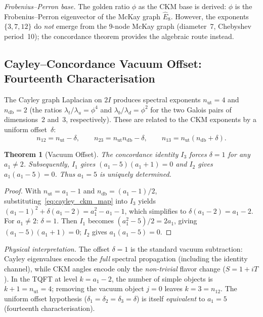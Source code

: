 \documentclass[12pt,a4paper]{article}
\newtheorem{theorem}{Theorem}
\theoremstyle{definition}
\begin{document}
\textit{Frobenius--Perron base.}  The golden ratio $\phi$ as the CKM base is derived: $\phi$ is the Frobenius--Perron eigenvector of the McKay graph $\hat{E}_8$.  However, the exponents $\{3,7,12\}$ do \emph{not} emerge from the 9-node McKay graph (diameter~7, Chebyshev period~10); the concordance theorem provides the algebraic route instead.

\subsection{Cayley--Concordance Vacuum Offset: Fourteenth Characterisation}
\label{sec:vacuum_offset}

The Cayley graph Laplacian on $2I$ produces spectral exponents $n_{\text{ut}} = 4$ and $n_{\text{db}} = 2$ (the ratios $\lambda_t/\lambda_u = \phi^4$ and $\lambda_b/\lambda_d = \phi^2$ for the two Galois pairs of dimensions~2 and~3, respectively).  These are related to the CKM exponents by a uniform offset~$\delta$:
\begin{equation}
n_{12} = n_{\text{ut}} - \delta, \qquad
n_{23} = n_{\text{ut}} n_{\text{db}} - \delta, \qquad
n_{13} = n_{\text{ut}}(n_{\text{db}} + \delta).
\label{eq:cayley_ckm_map}
\end{equation}
\begin{theorem}[Vacuum Offset]
\label{thm:vacuum_offset}
The concordance identity $I_3$ forces $\delta = 1$ for any $a_1 \neq 2$.  Subsequently, $I_1$ gives $(a_1 - 5)(a_1 + 1) = 0$ and $I_2$ gives $a_1(a_1 - 5) = 0$.  Thus $a_1 = 5$ is uniquely determined.
\end{theorem}
\begin{proof}
With $n_{\text{ut}} = a_1 - 1$ and $n_{\text{db}} = (a_1 - 1)/2$, substituting~\eqref{eq:cayley_ckm_map} into $I_3$ yields $(a_1-1)^2 + \delta(a_1-2) = a_1^2 - a_1 - 1$, which simplifies to $\delta(a_1-2) = a_1-2$.  For $a_1 \neq 2$: $\delta = 1$.  Then $I_1$ becomes $(a_1^2 - 5)/2 = 2a_1$, giving $(a_1-5)(a_1+1) = 0$; $I_2$ gives $a_1(a_1-5) = 0$.
\end{proof}

\noindent\textit{Physical interpretation.}  The offset $\delta = 1$ is the standard vacuum subtraction: Cayley eigenvalues encode the \emph{full} spectral propagation (including the identity channel), while CKM angles encode only the \emph{non-trivial} flavor change ($S = 1 + iT$).  In the TQFT at level $k = a_1 - 2$, the number of simple objects is $k + 1 = n_{\text{ut}} = 4$; removing the vacuum object $j = 0$ leaves $k = 3 = n_{12}$.  The uniform offset hypothesis ($\delta_1 = \delta_2 = \delta_3 = \delta$) is itself \emph{equivalent} to $a_1 = 5$ (fourteenth characterisation).
\end{document}

